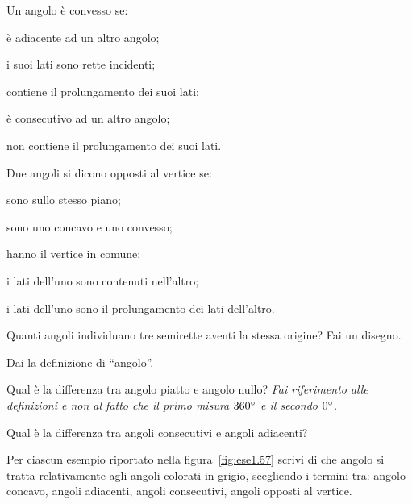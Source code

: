 \begin{esercizio}
\label{ese:1.51}
Un angolo è convesso se:
\begin{enumeratea}
\item è adiacente ad un altro angolo;
\item i suoi lati sono rette incidenti;
\item contiene il prolungamento dei suoi lati;
\item è consecutivo ad un altro angolo;
\item non contiene il prolungamento dei suoi lati.
\end{enumeratea}
\end{esercizio}

\pagebreak

\begin{esercizio}
\label{ese:1.52}
Due angoli si dicono opposti al vertice se:
\begin{enumeratea}
\item sono sullo stesso piano;
\item sono uno concavo e uno convesso;
\item hanno il vertice in comune;
\item i lati dell'uno sono contenuti nell'altro;
\item i lati dell'uno sono il prolungamento dei lati dell'altro.
\end{enumeratea}
\end{esercizio}

\begin{esercizio}
\label{ese:1.53}
Quanti angoli individuano tre semirette aventi la stessa origine? Fai un disegno.
\end{esercizio}

\begin{esercizio}
\label{ese:1.54}
Dai la definizione di ``angolo''.
\end{esercizio}

\begin{esercizio}
\label{ese:1.55}
Qual è la differenza tra angolo piatto e angolo nullo? \emph{Fai riferimento alle definizioni e non al fatto che il primo misura $360{}^{\circ}$ e il secondo $0{}^{\circ}$.}
\end{esercizio}

\begin{esercizio}
\label{ese:1.56}
Qual è la differenza tra angoli consecutivi e angoli adiacenti?
\end{esercizio}

\begin{esercizio}
\label{ese:1.57}
Per ciascun esempio riportato nella figura~\ref{fig:ese1.57} scrivi di che angolo si tratta relativamente agli angoli colorati in grigio, scegliendo i termini tra: angolo concavo, angoli adiacenti, angoli consecutivi, angoli opposti al vertice.
\end{esercizio}

